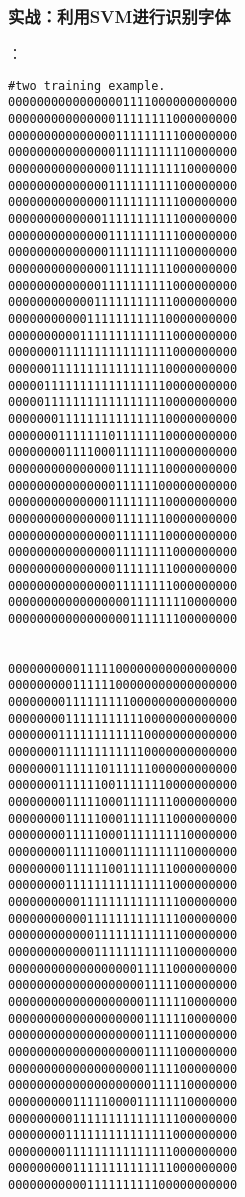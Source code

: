 \subsubsection{实战：利用SVM进行识别字体}
：
\begin{lstlisting}
#two training example.
00000000000000001111000000000000
00000000000000011111111000000000
00000000000000011111111100000000
00000000000000011111111110000000
00000000000000011111111110000000
00000000000000111111111100000000
00000000000000111111111100000000
00000000000001111111111100000000
00000000000000111111111100000000
00000000000000111111111100000000
00000000000000111111111000000000
00000000000001111111111000000000
00000000000011111111111000000000
00000000000111111111110000000000
00000000001111111111111000000000
00000001111111111111111000000000
00000011111111111111110000000000
00000111111111111111110000000000
00000111111111111111110000000000
00000001111111111111110000000000
00000001111111011111110000000000
00000000111100011111110000000000
00000000000000011111110000000000
00000000000000011111100000000000
00000000000000111111110000000000
00000000000000011111110000000000
00000000000000011111110000000000
00000000000000011111111000000000
00000000000000011111111000000000
00000000000000011111111000000000
00000000000000000111111110000000
00000000000000000111111100000000


00000000001111100000000000000000
00000000011111100000000000000000
00000000111111111000000000000000
00000000111111111110000000000000
00000001111111111110000000000000
00000001111111111110000000000000
00000001111110111111000000000000
00000001111110011111110000000000
00000000111110001111111000000000
00000000111110001111111000000000
00000000111110001111111110000000
00000000111110001111111110000000
00000000111111001111111000000000
00000000111111111111111000000000
00000000001111111111111100000000
00000000000111111111111100000000
00000000000011111111111100000000
00000000000011111111111100000000
00000000000000000011111000000000
00000000000000000001111100000000
00000000000000000001111110000000
00000000000000000001111110000000
00000000000000000001111100000000
00000000000000000001111100000000
00000000000000000001111100000000
00000000000000000000111110000000
00000000011111000011111110000000
00000000011111111111111100000000
00000000111111111111111000000000
00000000111111111111111000000000
00000000011111111111111000000000
00000000000111111111100000000000

\end{lstlisting}

